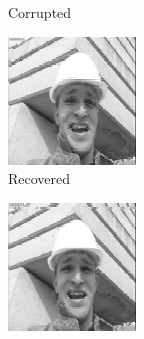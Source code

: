 \begin{figure}
\begin{subfigure}{0.4\textwidth}
    \caption{Corrupted}
  \end{subfigure}
  \begin{subfigure}{0.4\textwidth}
    \centering
    \includegraphics[width=.9\textwidth]{Chapter7/Images/foreman70_rec_18.png}
    \caption{Recovered}
  \end{subfigure}
  \begin{subfigure}{0.4\textwidth}
    \centering
    \includegraphics[width=.9\textwidth]{Chapter7/Images/foreman70_rec_22.png}

\end{subfigure}
\end{figure}
